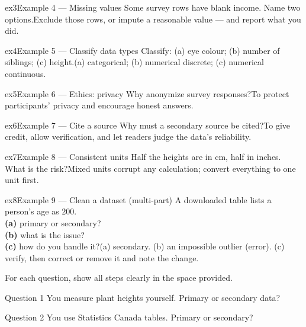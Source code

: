 \documentclass[11pt]{article}
\begin{document}
\begin{example}{ex3}{Example 4 --- Missing values}
Some survey rows have blank income. Name two options.\soln Exclude those rows, or impute a reasonable value --- and report what you did.
\end{example}

\begin{example}{ex4}{Example 5 --- Classify data types}
Classify: (a) eye colour; (b) number of siblings; (c) height.\soln (a) categorical; (b) numerical discrete; (c) numerical continuous.
\end{example}

\begin{example}{ex5}{Example 6 --- Ethics: privacy}
Why anonymize survey responses?\soln To protect participants' privacy and encourage honest answers.
\end{example}

\begin{example}{ex6}{Example 7 --- Cite a source}
Why must a secondary source be cited?\soln To give credit, allow verification, and let readers judge the data's reliability.
\end{example}

\begin{example}{ex7}{Example 8 --- Consistent units}
Half the heights are in cm, half in inches. What is the risk?\soln Mixed units corrupt any calculation; convert everything to one unit first.
\end{example}

\begin{example}{ex8}{Example 9 --- Clean a dataset (multi-part)}
A downloaded table lists a person's age as $200$. \\ \textbf{(a)} primary or secondary? \\ \textbf{(b)} what is the issue? \\ \textbf{(c)} how do you handle it?\soln (a) secondary. (b) an impossible outlier (error). (c) verify, then correct or remove it and note the change.
\end{example}

\clearpage
{}
For each question, show all steps clearly in the space provided.

\begin{qbox}{Question 1}
You measure plant heights yourself. Primary or secondary data?\workspace{2.4cm}
\end{qbox}

\begin{qbox}{Question 2}
You use Statistics Canada tables. Primary or secondary?\workspace{2.4cm}
\end{qbox}
\end{document}
